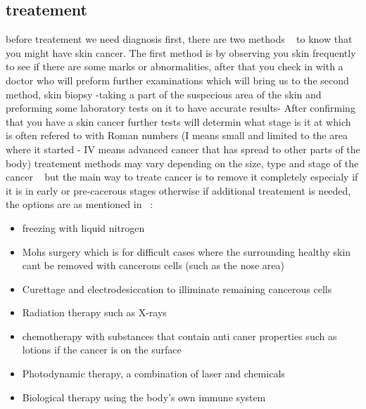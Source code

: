     \subsection{treatement}
        before treatement we need diagnosis first, there are two methods ~\cite{clinic2020} to  know that you might have skin cancer. The first method is by observing you skin frequently to see if there are some marks or abnormalities, after that you check in with a doctor who will preform further examinations which will bring us to the second method, skin biopsy -taking a part of the suspecious area of the skin and preforming some laboratory tests on it to have accurate results-
        After confirming that you have a skin cancer further tests will determin what stage is it at which is often refered to with Roman numbers (I means small and limited to the area where it started - IV means advanced cancer that has spread to other parts of the body)
        treatement methods may vary depending on the size, type and stage of the cancer ~\cite{nhs2020} but the main way to treate cancer is to remove it completely especialy if it is in early or pre-cacerous stages otherwise if additional treatement is needed, the options are as mentioned in ~\cite{clinic2020}:
            \begin{itemize}
                \item freezing with liquid nitrogen
                \item Mohs surgery which is for difficult cases where the surrounding healthy skin cant be removed with cancerous cells (such as the nose area)
                \item Curettage and electrodesiccation to illiminate remaining cancerous cells  
                \item Radiation therapy such as X-rays
                \item chemotherapy with substances that contain anti caner properties such as lotions if the cancer is on the surface
                \item Photodynamic therapy, a combination of laser and chemicals 
                \item Biological therapy using the body's own immune system
            \end{itemize}

